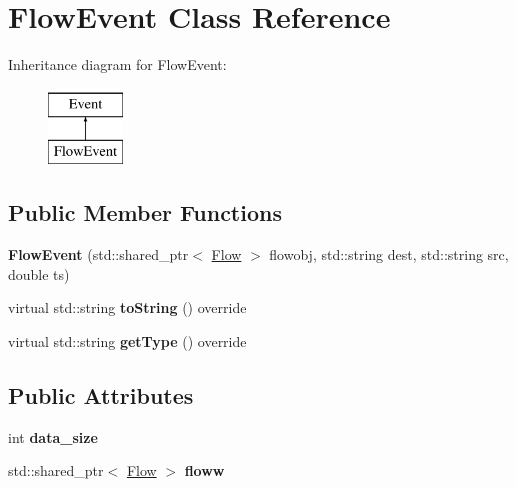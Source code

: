 \hypertarget{classFlowEvent}{\section{\-Flow\-Event \-Class \-Reference}
\label{classFlowEvent}
}
\-Inheritance diagram for \-Flow\-Event\-:\begin{figure}[H]
\begin{center}
\leavevmode
\includegraphics[height=2.000000cm]{classFlowEvent}
\end{center}
\end{figure}
\subsection*{\-Public \-Member \-Functions}
\begin{DoxyCompactItemize}
\item 
\hypertarget{classFlowEvent_a9d97fae76b3d07e6de4db669b95c9d48}{{\bfseries \-Flow\-Event} (std\-::shared\-\_\-ptr$<$ \hyperlink{classFlow}{\-Flow} $>$ flowobj, std\-::string dest, std\-::string src, double ts)}\label{classFlowEvent_a9d97fae76b3d07e6de4db669b95c9d48}

\item 
\hypertarget{classFlowEvent_a9e52eec8275fc6639be057b7218d5f6f}{virtual std\-::string {\bfseries to\-String} () override}\label{classFlowEvent_a9e52eec8275fc6639be057b7218d5f6f}

\item 
\hypertarget{classFlowEvent_a6712fde91ba4bbe86918315e85dff998}{virtual std\-::string {\bfseries get\-Type} () override}\label{classFlowEvent_a6712fde91ba4bbe86918315e85dff998}

\end{DoxyCompactItemize}
\subsection*{\-Public \-Attributes}
\begin{DoxyCompactItemize}
\item 
\hypertarget{classFlowEvent_ae6010e994bd60eff8cb63478f1df0f40}{int {\bfseries data\-\_\-size}}\label{classFlowEvent_ae6010e994bd60eff8cb63478f1df0f40}

\item 
\hypertarget{classFlowEvent_ad0ecfc4035bbfcfaa16f87fcea1b90f2}{std\-::shared\-\_\-ptr$<$ \hyperlink{classFlow}{\-Flow} $>$ {\bfseries floww}}\label{classFlowEvent_ad0ecfc4035bbfcfaa16f87fcea1b90f2}

\end{DoxyCompactItemize}



